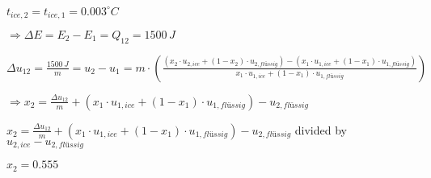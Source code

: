 \( t_{ice,2} = t_{ice,1} = 0.003^\circ C \)  

\( \Rightarrow \Delta E = E_2 - E_1 = Q_{12} = 1500 \, J \)  

\( \Delta u_{12} = \frac{1500 \, J}{m} = u_2 - u_1 = m \cdot \left( \frac{(x_2 \cdot u_{2,ice} + (1 - x_2) \cdot u_{2,flüssig}) - (x_1 \cdot u_{1,ice} + (1 - x_1) \cdot u_{1,flüssig})}{x_1 \cdot u_{1,ice} + (1 - x_1) \cdot u_{1,flüssig}} \right) \)  

\( \Rightarrow x_2 = \frac{\Delta u_{12}}{m} + \left( x_1 \cdot u_{1,ice} + (1 - x_1) \cdot u_{1,flüssig} \right) - u_{2,flüssig} \)  

\( x_2 = \frac{\Delta u_{12}}{m} + \left( x_1 \cdot u_{1,ice} + (1 - x_1) \cdot u_{1,flüssig} \right) - u_{2,flüssig} \) divided by \( u_{2,ice} - u_{2,flüssig} \)  

\( x_2 = 0.555 \)